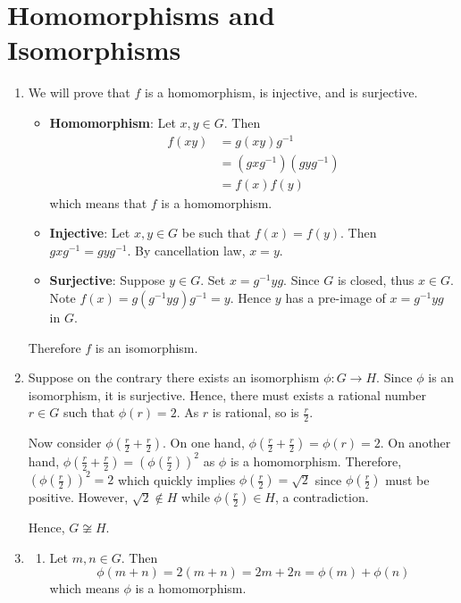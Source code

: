 \section{Homomorphisms and Isomorphisms}
\begin{enumerate}
    \item We will prove that $f$ is a homomorphism, is injective, and is surjective.
    \begin{itemize}
        \item \textbf{Homomorphism}: Let $x, y \in G$. Then
        \begin{align*}
            f(xy) &= g(xy)g^{-1}\\
            &= (gxg^{-1})(gyg^{-1})\\
            &= f(x)f(y)
        \end{align*}
        which means that $f$ is a homomorphism.
        \item \textbf{Injective}: Let $x, y \in G$ be such that $f(x) = f(y)$. Then $gxg^{-1} = gyg^{-1}$. By cancellation law, $x = y$.
        \item \textbf{Surjective}: Suppose $y \in G$. Set $x = g^{-1}yg$. Since $G$ is closed, thus $x \in G$. Note $f(x) = g(g^{-1}yg)g^{-1} = y$. Hence $y$ has a pre-image of $x = g^{-1}yg$ in $G$.
    \end{itemize}
    Therefore $f$ is an isomorphism.

    \item Suppose on the contrary there exists an isomorphism $\phi: G \to H$. Since $\phi$ is an isomorphism, it is surjective. Hence, there must exists a rational number $r \in G$ such that $\phi(r) = 2$. As $r$ is rational, so is $\frac r2$.

    Now consider $\phi\left(\frac r2 + \frac r2\right)$. On one hand, $\phi\left(\frac r2 + \frac r2\right) = \phi(r) = 2$. On another hand, $\phi(\frac r2 + \frac r2) = \left(\phi\left(\frac r2\right)\right)^2$ as $\phi$ is a homomorphism. Therefore, $\left(\phi\left(\frac r2\right)\right)^2 = 2$ which quickly implies $\phi\left(\frac r2\right) = \sqrt 2$ since $\phi\left(\frac r2\right)$ must be positive. However, $\sqrt 2 \notin H$ while $\phi\left(\frac r2\right) \in H$, a contradiction.

    Hence, $G \not\cong H$.

    \item \begin{enumerate}[label=(\alph*)]
        \item Let $m, n \in G$. Then
        \[
            \phi(m + n) = 2(m + n) = 2m + 2n = \phi(m) + \phi(n)
        \]
        which means $\phi$ is a homomorphism.


\end{enumerate}
\end{enumerate}
